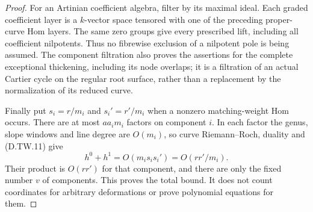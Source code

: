 \begin{proof}
For an Artinian coefficient algebra, filter by its
maximal ideal. Each graded coefficient layer is a
$k$-vector space tensored with one of the preceding
proper-curve Hom layers. The same zero groups give
every prescribed lift, including all coefficient
nilpotents. Thus no fibrewise exclusion of a nilpotent
pole is being assumed. The component filtration also
proves the assertions for the complete exceptional
thickening, including its node overlaps; it is a
filtration of an actual Cartier cycle on the regular
root surface, rather than a replacement by the
normalization of its reduced curve.

Finally put $s_i=r/m_i$ and $s_i'=r'/m_i$ when a
nonzero matching-weight Hom occurs. There are at
most $aa_i m_i$ factors on component $i$. In each
factor the genus, slope windows and line degree
are $O(m_i)$, so curve Riemann--Roch, duality and
(D.TW.11) give
\[
 h^0+h^1=O(m_i s_i s_i')=O(rr'/m_i).
                                                        \tag{D.TW.12}
\]
Their product is $O(rr')$ for that component, and
there are only the fixed number $v$ of components.
This proves the total bound. It does not count
coordinates for arbitrary deformations or prove
polynomial equations for them.
\end{proof}

